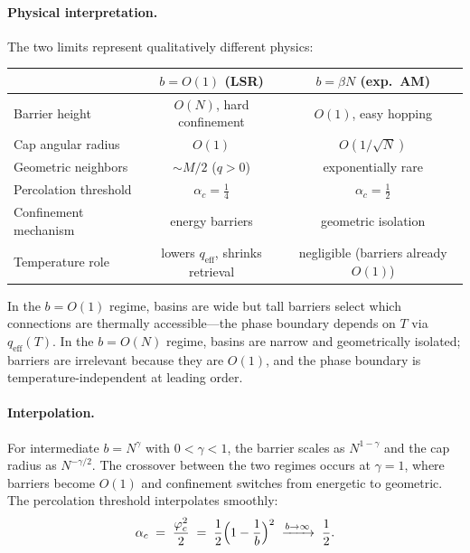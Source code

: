 \documentclass[11pt]{article}
\newcommand{\vp}{\varphi}
\begin{document}
\paragraph{Physical interpretation.}
The two limits represent qualitatively different physics:
\begin{center}
\begin{tabular}{lcc}
\hline
  & $b = O(1)$ (LSR) & $b = \beta N$ (exp.\ AM) \\
\hline
Barrier height   & $O(N)$, hard confinement
                 & $O(1)$, easy hopping \\
Cap angular radius & $O(1)$
                   & $O(1/\sqrt{N})$ \\
Geometric neighbors & $\sim M/2$ ($q > 0$)
                    & exponentially rare \\
Percolation threshold & $\alpha_c = \tfrac{1}{4}$
                      & $\alpha_c = \tfrac{1}{2}$ \\
Confinement mechanism & energy barriers
                      & geometric isolation \\
Temperature role & lowers $q_\mathrm{eff}$,
                   shrinks retrieval
                 & negligible (barriers already $O(1)$) \\
\hline
\end{tabular}
\end{center}
In the $b = O(1)$ regime, basins are wide but tall barriers
select which connections are thermally accessible---the phase
boundary depends on $T$ via $q_\mathrm{eff}(T)$.
In the $b = O(N)$ regime, basins are narrow and geometrically
isolated; barriers are irrelevant because they are $O(1)$,
and the phase boundary is temperature-independent at leading
order.

\paragraph{Interpolation.}
For intermediate $b = N^\gamma$ with $0 < \gamma < 1$,
the barrier scales as $N^{1-\gamma}$ and the cap radius as
$N^{-\gamma/2}$.  The crossover between the two regimes
occurs at $\gamma = 1$, where barriers become $O(1)$
and confinement switches from energetic to geometric.
The percolation threshold interpolates smoothly:
\begin{equation}\label{eq:alpha_c_gamma}
  \alpha_c \;=\; \frac{\vp_c^2}{2}
  \;=\; \frac{1}{2}\Bigl(1 - \frac{1}{b}\Bigr)^2
  \;\xrightarrow{b\to\infty}\; \frac{1}{2}.
\end{equation}
\end{document}
